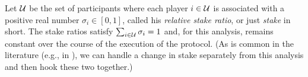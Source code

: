 







Let $\mathcal{U}$ be the set of participants 
where each player $i \in \mathcal{U}$ is associated with a positive real number 
$\sigma_i \in [0,1]$, called his \emph{relative stake ratio}, or just \emph{stake} in short. 
The stake ratios satisfy $\sum_{i \in \mathcal{U}} \sigma_i = 1$ 
and, for this analysis, remains constant over the course of the execution of the protocol. 
(As is common in the literature (e.g., in \cite{Ouroboros,Praos,SnowWhite}), 
we can handle a change in stake separately from this analysis and then hook these two together.)

